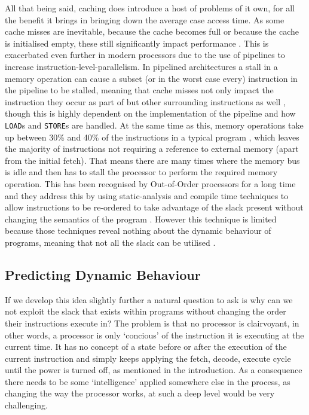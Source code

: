 All that being said, caching does introduce a host of problems of it own, for all the benefit it brings in bringing down the average case access time. As some cache misses are inevitable, because the cache becomes full or because the cache is initialised empty, these still significantly impact performance \cite{al-zoubiPerformanceEvaluationCache2004}. This is exacerbated even further in modern processors due to the use of pipelines to increase instruction-level-parallelism. In pipelined architectures a stall in a memory operation can cause a subset (or in the worst case every) instruction in the pipeline to be stalled, meaning that cache misses not only impact the instruction they occur as part of but other surrounding instructions as well \cite{pattersonComputerOrganizationDesign2018}, though this is highly dependent on the implementation of the pipeline and how \texttt{LOAD}s and \texttt{STORE}s are handled. At the same time as this, memory operations take up between 30\% and 40\% of the instructions in a typical program \cite{bieniaPARSECBenchmarkSuite2008, limayeWorkloadCharacterizationSPEC2018}, which leaves the majority of instructions not requiring a reference to external memory (apart from the initial fetch). That means there are many times where the memory bus is idle and then has to stall the processor to perform the required memory operation. This has been recognised by Out-of-Order processors for a long time and they address this by using static-analysis and compile time techniques to allow instructions to be re-ordered to take advantage of the slack present without changing the semantics of the program \cite{hennessyComputerArchitectureQuantitative2019}. However this technique is limited because those techniques reveal nothing about the dynamic behaviour of programs, meaning that not all the slack can be utilised \cite{whithamTimePredictableOutofOrderExecution2010}. 

\subsection{Predicting Dynamic Behaviour}

If we develop this idea slightly further a natural question to ask is why can we not exploit the slack that exists within programs without changing the order their instructions execute in? The problem is that no processor is clairvoyant, in other words, a processor is only `concious' of the instruction it is executing at the current time. It has no concept of a state before or after the execution of the current instruction and simply keeps applying the fetch, decode, execute cycle until the power is turned off, as mentioned in the introduction. As a consequence there needs to be some `intelligence' applied somewhere else in the process, as changing the way the processor works, at such a deep level would be very challenging.

